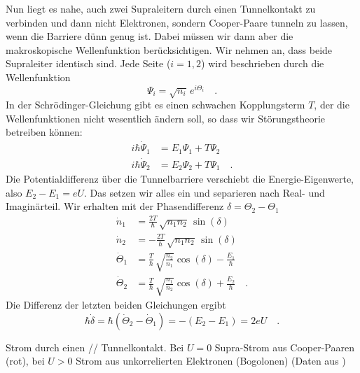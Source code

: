 Nun liegt es nahe, auch zwei Supraleitern durch einen Tunnelkontakt zu verbinden und dann nicht Elektronen, sondern Cooper-Paare tunneln zu lassen, wenn die Barriere dünn genug ist. Dabei müssen wir dann aber die makroskopische Wellenfunktion berücksichtigen. Wir nehmen an, dass beide Supraleiter identisch sind. Jede Seite ($i=1, 2$) wird beschrieben durch die Wellenfunktion 
\begin{equation}
  \Psi_i = \sqrt{n_i} \, e^{i \Theta_i} \quad .
\end{equation}
In der Schrödinger-Gleichung gibt es einen schwachen Kopplungsterm $T$, der die Wellenfunktionen nicht wesentlich ändern soll, so dass wir Störungstheorie betreiben können:
\begin{align}
    i \hbar \dot{\Psi}_1 & =  E_1 \Psi_1 + T \Psi_2 \\ 
    i \hbar \dot{\Psi}_2 & =  E_2 \Psi_2 + T \Psi_1 \quad .
\end{align}
Die Potentialdifferenz über die Tunnelbarriere verschiebt die Energie-Eigenwerte, also $E_2 - E_1 = e U$. Das setzen wir alles ein und separieren nach Real- und Imaginärteil. Wir erhalten mit der Phasendifferenz $\delta = \Theta_2 - \Theta_1$
\begin{align}
    \dot{n}_1 & = \frac{2 T}{\hbar} \, \sqrt{n_1 n_2} \,  \sin(\delta) \\
    \dot{n}_2 & = -\frac{2 T}{\hbar} \, \sqrt{n_1 n_2} \,  \sin(\delta) \\
    \dot{\Theta}_1 &= \frac{T}{\hbar} \, \sqrt{\frac{n_2}{n_1}} \cos(\delta) - \frac{E_1}{\hbar} \\
    \dot{\Theta}_2 &= \frac{T}{\hbar} \, \sqrt{\frac{n_1}{n_2}} \cos(\delta) + \frac{E_2}{\hbar} \quad .
\end{align} 
Die Differenz der letzten beiden Gleichungen ergibt
\begin{equation}
   \hbar \dot{\delta} =  \hbar ( \dot{\Theta}_2 -  \dot{\Theta}_1 ) = - (E_2 - E_1) = 2eU \quad .
\end{equation}


\begin{marginfigure}
    \caption{Strom durch einen // Tunnelkontakt. Bei $U=0$ Supra-Strom aus Cooper-Paaren (rot), bei $U>0$ Strom aus unkorrelierten Elektronen (Bogolonen) (Daten aus \cite{Langenberg1966})
    \label{fig:6_SC_tunnel}}
\end{marginfigure}


